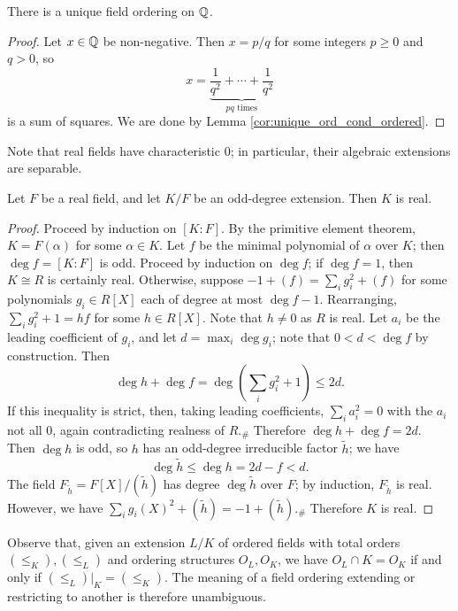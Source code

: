 \begin{corollary}
  \label{cor:unique_ord_Q}
  \leanok
  There is a unique field ordering on $\mathbb{Q}$.
\end{corollary}
\begin{proof}
  \leanok
  Let $x\in\mathbb{Q}$ be non-negative. Then $x=p/q$ for some integers $p\geq0$ and $q>0$, so 
  \[x=\underbrace{\frac{1}{q^2}+\cdots+\frac{1}{q^2}}_{pq\text{ times}}\]
  is a sum of squares. We are done by Lemma \ref{cor:unique_ord_cond_ordered}.
\end{proof}

Note that real fields have characteristic 0; in particular, their algebraic extensions are separable.

\begin{lemma}
  \label{lem:odd_deg_real}
  Let $F$ be a real field, and let $K/F$ be an odd-degree extension. Then $K$ is real.
\end{lemma}
\begin{proof}
  Proceed by induction on $[K:F]$. By the primitive element theorem, $K=F(\alpha)$ for some $\alpha\in K$. Let $f$ be the minimal polynomial of $\alpha$ over $K$; then $\deg f=[K:F]$ is odd. Proceed by induction on $\deg f$; if $\deg f=1$, then $K\cong R$ is certainly real. Otherwise, suppose $-1+(f)=\sum_ig_i^2+(f)$ for some polynomials $g_i\in R[X]$ each of degree at most $\deg f-1$. Rearranging, $\sum_ig_i^2+1=hf$ for some $h\in R[X]$. Note that $h\neq0$ as $R$ is real. Let $a_i$ be the leading coefficient of $g_i$, and let $d=\max_i\deg g_i$; note that $0<d<\deg f$ by construction. Then
  \[\deg h+\deg f=\deg(\sum_i g_i^2+1)\leq 2d.\]
  If this inequality is strict, then, taking leading coefficients, $\sum_i a_i^2=0$ with the $a_i$ not all 0, again contradicting realness of $R$.$_\#$ Therefore $\deg h+\deg f=2d$. Then $\deg h$ is odd, so $h$ has an odd-degree irreducible factor $\tilde h$; we have
  \[\deg\tilde h\leq\deg h=2d-f<d.\]
  The field $F_{\tilde h}=F[X]/(\tilde h)$ has degree $\deg\tilde h$ over $F$; by induction, $F_{\tilde h}$ is real. However, we have $\sum_i g_i(X)^2+(\tilde h)=-1+(\tilde h)$.$_\#$ Therefore $K$ is real.
\end{proof}

Observe that, given an extension $L/K$ of ordered fields with total orders $(\leq_K),(\leq_L)$ and ordering structures $O_L,O_K$, we have $O_L\cap K=O_K$ if and only if $(\leq_L)|_K=(\leq_K)$. The meaning of a field ordering extending or restricting to another is therefore unambiguous.

